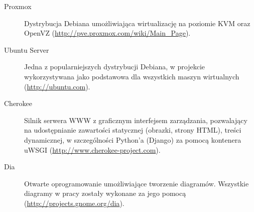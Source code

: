 \begin{description}
    \item[Proxmox] Dystrybucja Debiana umożliwiająca wirtualizację na poziomie KVM oraz OpenVZ (\url{http://pve.proxmox.com/wiki/Main_Page}).
    \item[Ubuntu Server] Jedna z popularniejszych dystrybucji Debiana, w projekcie wykorzystywana jako podstawowa dla wszystkich maszyn wirtualnych (\url{http://ubuntu.com}).
    \item[Cherokee] Silnik serwera WWW z graficznym interfejsem zarządzania, pozwalający na udostępnianie zawartości statycznej (obrazki, strony HTML), treści dynamicznej, w szczególności Python'a (Django) za pomocą kontenera uWSGI (\url{http://www.cherokee-project.com}).
    \item[Dia] Otwarte oprogramowanie umożliwiające tworzenie diagramów. Wszystkie diagramy w pracy zostały wykonane za jego pomocą (\url{http://projects.gnome.org/dia}).
\end{description}

\newpage
